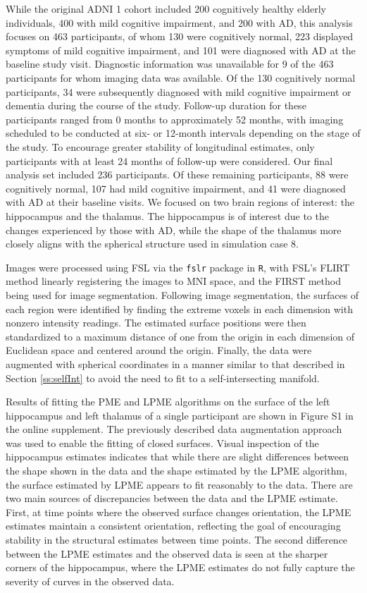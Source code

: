 \documentclass[12pt]{article}
\theoremstyle{definition}
\begin{document}
While the original ADNI 1 cohort included 200 cognitively healthy elderly individuals, 400 with mild cognitive impairment, and 200 with AD, this analysis focuses on 463 participants, of whom 130 were cognitively normal, 223 displayed symptoms of mild cognitive impairment, and 101 were diagnosed with AD at the baseline study visit. Diagnostic information was unavailable for 9 of the 463 participants for whom imaging data was available. Of the 130 cognitively normal participants, 34 were subsequently diagnosed with mild cognitive impairment or dementia during the course of the study. Follow-up duration for these participants ranged from 0 months to approximately 52 months, with imaging scheduled to be conducted at six- or 12-month intervals depending on the stage of the study. To encourage greater stability of longitudinal estimates, only participants with at least 24 months of follow-up were considered. Our final analysis set included 236 participants. Of these remaining participants, 88 were cognitively normal, 107 had mild cognitive impairment, and 41 were diagnosed with AD at their baseline visits. We focused on two brain regions of interest: the hippocampus and the thalamus. The hippocampus is of interest due to the changes experienced by those with AD, while the shape of the thalamus more closely aligns with the spherical structure used in simulation case 8.

Images were processed using FSL via the \texttt{fslr} package \citep{muschelliFslrConnectingFSL2015} in \texttt{R}, with FSL's FLIRT method linearly registering the images to MNI space, and the FIRST method being used for image segmentation. Following image segmentation, the surfaces of each region were identified by finding the extreme voxels in each dimension with nonzero intensity readings. The estimated surface positions were then standardized to a maximum distance of one from the origin in each dimension of Euclidean space and centered around the origin. Finally, the data were augmented with spherical coordinates in a manner similar to that described in Section \ref{ss:selfInt} to avoid the need to fit to a self-intersecting manifold.

Results of fitting the PME and LPME algorithms on the surface of the left hippocampus and left thalamus of a single participant are shown in Figure S1 in the online supplement. The previously described data augmentation approach was used to enable the fitting of closed surfaces. Visual inspection of the hippocampus estimates indicates that while there are slight differences between the shape shown in the data and the shape estimated by the LPME algorithm, the surface estimated by LPME appears to fit reasonably to the data. There are two main sources of discrepancies between the data and the LPME estimate. First, at time points where the observed surface changes orientation, the LPME estimates maintain a consistent orientation, reflecting the goal of encouraging stability in the structural estimates between time points. The second difference between the LPME estimates and the observed data is seen at the sharper corners of the hippocampus, where the LPME estimates do not fully capture the severity of curves in the observed data.
\end{document}

